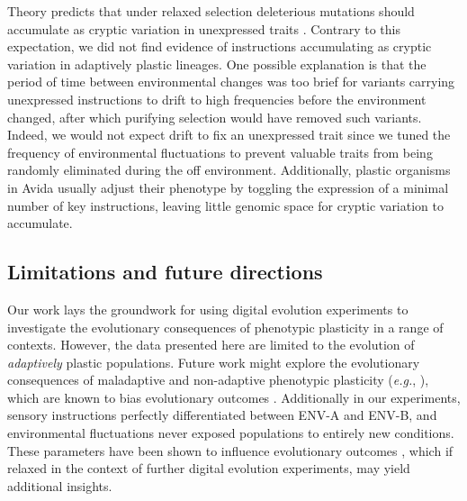 Theory predicts that under relaxed selection deleterious mutations should accumulate as cryptic variation in unexpressed traits \citep{lahti_relaxed_2009}.
Contrary to this expectation, we did not find evidence of  instructions accumulating as cryptic variation in adaptively plastic lineages.
One possible explanation is that the period of time between environmental changes was too brief for variants carrying unexpressed  instructions to drift to high frequencies before the environment changed, after which purifying selection would have removed such variants.
Indeed, we would not expect drift to fix an unexpressed trait since we tuned the frequency of environmental fluctuations to prevent valuable traits from being randomly eliminated during the off environment.
Additionally, plastic organisms in Avida usually adjust their phenotype by toggling the expression of a minimal number of key instructions, leaving little genomic space for cryptic variation to accumulate.

\subsection{Limitations and future directions}


Our work lays the groundwork for using digital evolution experiments to investigate the evolutionary consequences of phenotypic plasticity in a range of contexts.
However, the data presented here are limited to the evolution of \textit{adaptively} plastic populations.
Future work might explore the evolutionary consequences of maladaptive and non-adaptive phenotypic plasticity (\textit{e.g.}, \citealt{leroi_temperature_1994}), which are known to bias evolutionary outcomes \citep{ghalambor_non-adaptive_2015}. 
Additionally in our experiments, sensory instructions perfectly differentiated between ENV-A and ENV-B, and environmental fluctuations never exposed populations to entirely new conditions.
These parameters have been shown to influence evolutionary outcomes \citep{li_digital_2004,boyer_adaptation_2021}, which if relaxed in the context of further digital evolution experiments, may yield additional insights.

